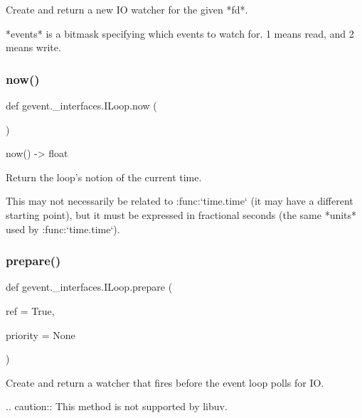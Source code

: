 \begin{DoxyVerb}Create and return a new IO watcher for the given *fd*.

*events* is a bitmask specifying which events to watch
for. 1 means read, and 2 means write.
\end{DoxyVerb}
 \mbox{\label{classgevent_1_1__interfaces_1_1_i_loop_aec5c80eb8f80fc97f69630579a0aa469}} 
\subsubsection{\texorpdfstring{now()}{now()}}
{\footnotesize\ttfamily def gevent.\+\_\+interfaces.\+I\+Loop.\+now (\begin{DoxyParamCaption}{ }\end{DoxyParamCaption})}

\begin{DoxyVerb}now() -> float

Return the loop's notion of the current time.

This may not necessarily be related to :func:`time.time` (it
may have a different starting point), but it must be expressed
in fractional seconds (the same *units* used by :func:`time.time`).
\end{DoxyVerb}
 \mbox{\label{classgevent_1_1__interfaces_1_1_i_loop_a99382b16152552bc9a38100746f1323f}} 
\subsubsection{\texorpdfstring{prepare()}{prepare()}}
{\footnotesize\ttfamily def gevent.\+\_\+interfaces.\+I\+Loop.\+prepare (\begin{DoxyParamCaption}\item[{}]{ref = {\ttfamily True},  }\item[{}]{priority = {\ttfamily None} }\end{DoxyParamCaption})}

\begin{DoxyVerb}Create and return a watcher that fires before the event loop
polls for IO.

.. caution:: This method is not supported by libuv.
\end{DoxyVerb}
 \mbox{\label{classgevent_1_1__interfaces_1_1_i_loop_a7f53dece62e43f3f57e37e5bb62d2c94}} 
